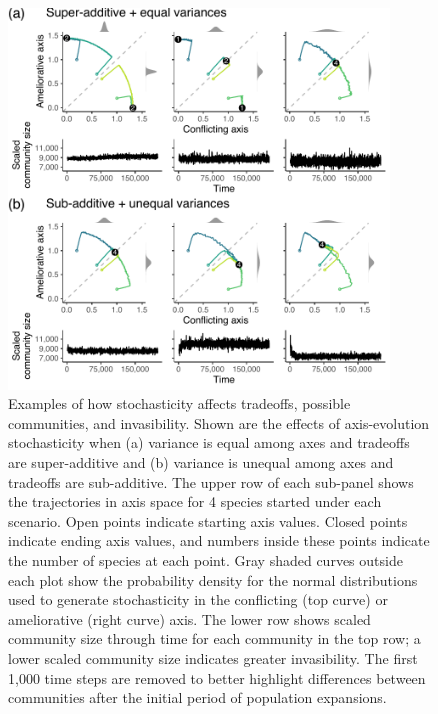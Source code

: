 \documentclass[12pt]{article}
\begin{document}
\begin{figure}[ht!]
\centering
\includegraphics[width=0.9\textwidth,keepaspectratio]{5-stoch.pdf}
\caption{Examples of how stochasticity affects tradeoffs, 
possible communities, and invasibility.
Shown are the effects of axis-evolution stochasticity when
(a) variance is equal among axes and tradeoffs are super-additive and 
(b) variance is unequal among axes and tradeoffs are sub-additive.
The upper row of each sub-panel shows the trajectories in axis space
for 4 species started under each scenario.
Open points indicate starting axis values.
Closed points indicate ending axis values, and 
numbers inside these points indicate the number of species at each point.
Gray shaded curves outside each plot show the probability density for
the normal distributions used to generate stochasticity in the
conflicting (top curve) or ameliorative (right curve) axis.
The lower row shows scaled community size through time for each community
in the top row;
a lower scaled community size indicates greater invasibility.
The first 1,000 time steps are removed to better highlight differences
between communities after the initial period of population expansions.
}
\label{fig:stochasticity}
\end{figure}



\clearpage

\end{document}
